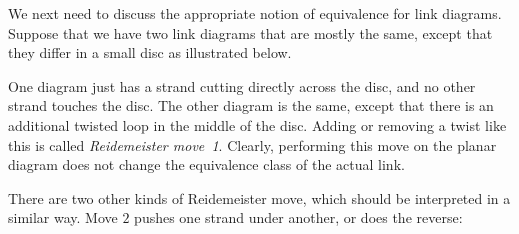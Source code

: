 \documentclass[reqno]{amsart}
\theoremstyle{definition}
\begin{document}
We next need to discuss the appropriate notion of equivalence for link
diagrams.  Suppose that we have two link diagrams that are mostly the
same, except that they differ in a small disc as illustrated below.
\begin{center}
\end{center}
One diagram just has a strand cutting directly across the disc, and no
other strand touches the disc.  The other diagram is the same, except
that there is an additional twisted loop in the middle of the disc.
Adding or removing a twist like this is called \emph{Reidemeister
 move~1}.  Clearly, performing this move on the planar diagram does
not change the equivalence class of the actual link.  


There are two other kinds of Reidemeister move, which should be
interpreted in a similar way.  Move $2$ pushes one strand under
another, or does the reverse:
\begin{center}
\end{center}
\end{document}
